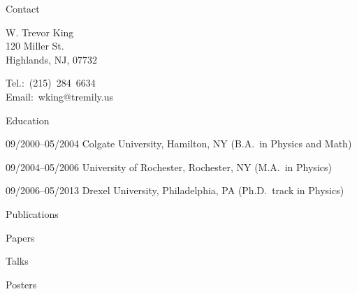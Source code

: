 \begin{vita}

\begin{cv}{}

  \begin{cvlist}{Contact}
  \item W. Trevor King\\
    120 Miller St.\\
    Highlands, NJ, 07732
  \item Tel.:~(215)~284~6634\\
    Email:~wking@tremily.us
  \end{cvlist}

  \begin{cvlist}{Education}
  \item[09/2000--05/2004] Colgate University, Hamilton, NY
    (B.A.~in Physics and Math)

  \item[09/2004--05/2006] University of Rochester, Rochester, NY
    (M.A.~in Physics)

  \item[09/2006--05/2013] Drexel University, Philadelphia, PA
    (Ph.D.~track in Physics)
  \end{cvlist}

  \begin{cvlist}{Publications}
    \item [Papers]
    \begin{bibunit}
      \nocite{
        king10}
      \putbib
    \end{bibunit}
    \item [Talks]
    \begin{bibunit}
      \nocite{
        2013-01-columbia,
        2009-10-life-cycles,
        2008-06-locks}
      \putbib
    \end{bibunit}
    \item [Posters]
    \begin{bibunit}
      \nocite{
        2013-04-swc,
        2011-04-saswsim,
        2010-04-open-source,
        2012-04-calibcant,
        2009-03-roughness,
        2008-04-sawsim,
        2008-02-stiffness}
      \putbib
    \end{bibunit}
  \end{cvlist}


\end{cv}
\end{vita}
